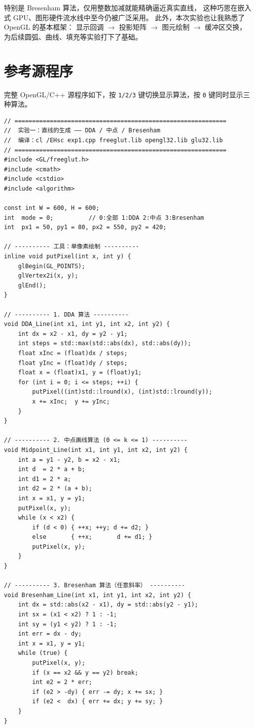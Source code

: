 \documentclass[a4paper,12pt]{ctexart}
\begin{document}
特别是 Bresenham 算法，仅用整数加减就能精确逼近真实直线，
这种巧思在嵌入式 GPU、图形硬件流水线中至今仍被广泛采用。
此外，本次实验也让我熟悉了 OpenGL 的基本框架：
显示回调 $\to$ 投影矩阵 $\to$ 图元绘制 $\to$ 缓冲区交换，
为后续圆弧、曲线、填充等实验打下了基础。

\section{参考源程序}

完整 OpenGL/C++ 源程序如下，按 \texttt{1/2/3} 键切换显示算法，按 \texttt{0} 键同时显示三种算法。

\begin{lstlisting}[style=cppstyle,caption={直线生成算法对比 —— 完整源代码}]
// ============================================================
//  实验一：直线的生成 —— DDA / 中点 / Bresenham
//  编译：cl /EHsc exp1.cpp freeglut.lib opengl32.lib glu32.lib
// ============================================================
#include <GL/freeglut.h>
#include <cmath>
#include <cstdio>
#include <algorithm>

const int W = 600, H = 600;
int  mode = 0;          // 0:全部 1:DDA 2:中点 3:Bresenham
int  px1 = 50, py1 = 80, px2 = 550, py2 = 420;

// ---------- 工具：单像素绘制 ----------
inline void putPixel(int x, int y) {
    glBegin(GL_POINTS);
    glVertex2i(x, y);
    glEnd();
}

// ---------- 1. DDA 算法 ----------
void DDA_Line(int x1, int y1, int x2, int y2) {
    int dx = x2 - x1, dy = y2 - y1;
    int steps = std::max(std::abs(dx), std::abs(dy));
    float xInc = (float)dx / steps;
    float yInc = (float)dy / steps;
    float x = (float)x1, y = (float)y1;
    for (int i = 0; i <= steps; ++i) {
        putPixel((int)std::lround(x), (int)std::lround(y));
        x += xInc;  y += yInc;
    }
}

// ---------- 2. 中点画线算法 (0 <= k <= 1) ----------
void Midpoint_Line(int x1, int y1, int x2, int y2) {
    int a = y1 - y2, b = x2 - x1;
    int d  = 2 * a + b;
    int d1 = 2 * a;
    int d2 = 2 * (a + b);
    int x = x1, y = y1;
    putPixel(x, y);
    while (x < x2) {
        if (d < 0) { ++x; ++y; d += d2; }
        else       { ++x;       d += d1; }
        putPixel(x, y);
    }
}

// ---------- 3. Bresenham 算法（任意斜率） ----------
void Bresenham_Line(int x1, int y1, int x2, int y2) {
    int dx = std::abs(x2 - x1), dy = std::abs(y2 - y1);
    int sx = (x1 < x2) ? 1 : -1;
    int sy = (y1 < y2) ? 1 : -1;
    int err = dx - dy;
    int x = x1, y = y1;
    while (true) {
        putPixel(x, y);
        if (x == x2 && y == y2) break;
        int e2 = 2 * err;
        if (e2 > -dy) { err -= dy; x += sx; }
        if (e2 <  dx) { err += dx; y += sy; }
    }
}


\end{lstlisting}
\end{document}
